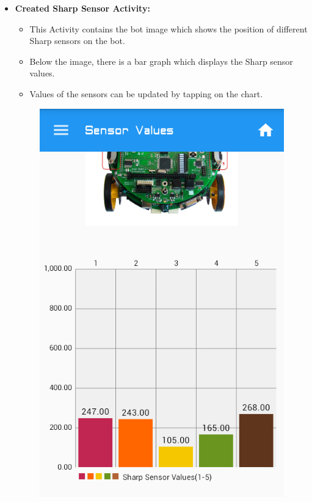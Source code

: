 \documentclass[a4paper,12pt,oneside]{book}
\begin{document}
\begin{enumerate}
\begin{itemize}
\begin{figure}[h]
				\end{figure}
			\newpage    
			\item \textbf{Created Sharp Sensor Activity:}
			\begin{itemize}
				\item This Activity contains the bot image which shows the position of different Sharp sensors on the bot.
				\item Below the image, there is a bar graph which displays the Sharp sensor values.
				\item Values of the sensors can be updated by tapping on the chart.
			\end{itemize} 
				\begin{figure}[h]
					\begin{center}
						\includegraphics[scale=0.4]{sharpsensor.png}

\end{center}
\end{figure}
\end{itemize}
\end{enumerate}
\end{document}
